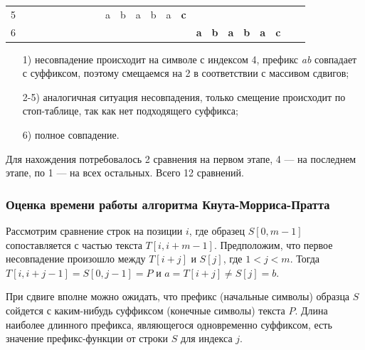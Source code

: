 \documentclass[a4paper,12pt]{article}
\begin{document}
\begin{table} [h!]
\begin{center}
\begin{tabular}{|rrrrrrrrrrrrrrrrrrrrrrr|}
         5 &            &            &            &            &            &            &            &            &          a &          b &          a &          b &          a &    {\bf c} &            &            &            &            &            &            &            &            \\

         6 &            &            &            &            &            &            &            &            &            &            &            &            &            &            &    {\bf a} &    {\bf b} &    {\bf a} &    {\bf b} &    {\bf a} &    {\bf c} &            &            \\
\hline
\end{tabular}  
\label{bm_cmp}
\end{center}
\end{table}

\begin{itemize}
\item[1)] несовпадение происходит на символе с индексом 4,
префикс \textit{ab} совпадает с суффиксом, поэтому смещаемся на 2
в соответствии с массивом сдвигов;
\item[2-5)] аналогичная ситуация несовпадения,
только смещение происходит по стоп-таблице, так как нет подходящего суффикса;
\item[6)] полное совпадение.
\end{itemize}

Для нахождения потребовалось 2 сравнения на первом этапе,
4 --- на последнем этапе, по 1 --- на всех остальных. Всего 12 сравнений.

\subsubsection{Оценка времени работы алгоритма Кнута-Морриса-Пратта}

Рассмотрим сравнение строк на позиции
$i$, где образец $S[0, m - 1]$
сопоставляется с частью текста
$T[i, i + m - 1]$.
Предположим, что первое несовпадение произошло
между $T[i + j]$ и $S[j]$,
где $1 < j < m$. Тогда
$T[i, i + j - 1] = S[0, j - 1] = P$ и
$a = T[i + j] \neq S[j] = b$.

При сдвиге вполне можно ожидать, что префикс 
(начальные символы)
образца $S$ сойдется с каким-нибудь суффиксом 
(конечные символы) текста $P$. Длина наиболее 
длинного префикса, являющегося одновременно 
суффиксом, есть значение префикс-функции от строки 
$S$ для 
индекса $j$.
\end{document}
